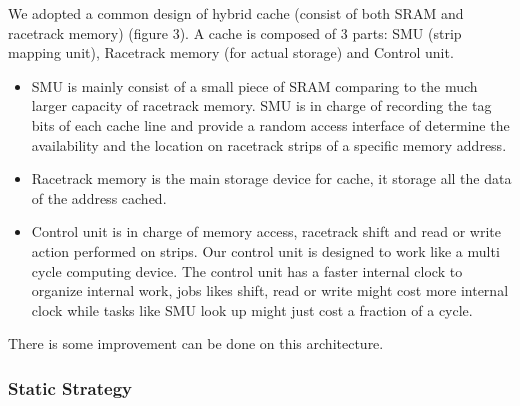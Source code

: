 \documentclass[11pt]{article}
\begin{document}
We adopted a common design of hybrid cache (consist of both SRAM and racetrack memory) (figure 3). A cache is composed of 3 parts: SMU (strip mapping unit), Racetrack memory (for actual storage) and Control unit. 

\begin{itemize}

\item SMU is mainly consist of a small piece of SRAM comparing to the much larger capacity of racetrack memory. SMU is in charge of recording the tag bits of each cache line and provide a random access interface of determine the availability and the location on racetrack strips of a specific memory address.

\item Racetrack memory is the main storage device for cache, it storage all the data of the address cached.

\item Control unit is in charge of memory access, racetrack shift and read or write action performed on strips. Our control unit is designed to work like a multi cycle computing device. The control unit has a faster internal clock to organize internal work, jobs likes shift, read or write might cost more internal clock while tasks like SMU look up might just cost a fraction of a cycle.
\end{itemize}

There is some improvement can be done on this architecture.

\subsubsection{Static Strategy}
\end{document}
